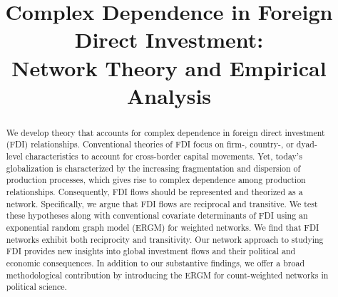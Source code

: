 \documentclass[reqno,onecolumn,letterpaper,12pt]{article}
\begin{document}
\title{Complex Dependence in Foreign Direct Investment: \\Network Theory and Empirical Analysis} %
\date{}
\maketitle

\thispagestyle{empty}
\singlespacing
\begin{abstract}
    \noindent We develop theory that accounts for complex dependence in foreign direct investment (FDI) relationships. Conventional theories of FDI focus on firm-, country-, or dyad-level characteristics to account for cross-border capital movements. Yet, today's globalization is characterized by the increasing fragmentation and dispersion of production processes, which gives rise to complex dependence among production relationships. Consequently, FDI flows should be represented and theorized as a network. Specifically, we argue that FDI flows are reciprocal and transitive. We test these hypotheses along with conventional covariate determinants of FDI using an exponential random graph model (ERGM) for weighted networks. We find that FDI networks exhibit both reciprocity and transitivity. Our network approach to studying FDI provides new insights into global investment flows and their political and economic consequences. In addition to our substantive findings, we offer a broad methodological contribution by introducing the ERGM for count-weighted networks in political science.



\end{abstract}
~\\
\end{document}
